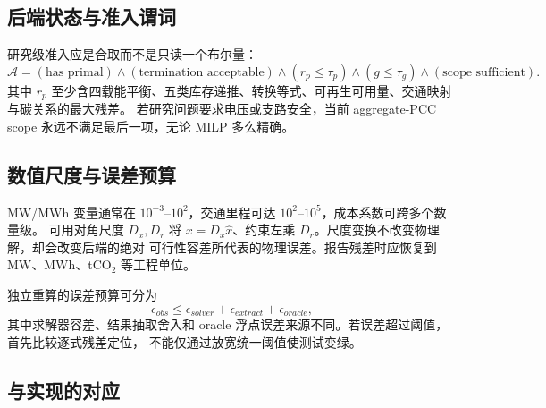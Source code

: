 \subsection{后端状态与准入谓词}

研究级准入应是合取而不是只读一个布尔量：
\begin{equation}
 \mathcal A=(\text{has primal})\land(\text{termination acceptable})\land
 (r_p\le\tau_p)\land(g\le\tau_g)\land(\text{scope sufficient}).
 \label{eq:ies-admission}
\end{equation}
其中 $r_p$ 至少含四载能平衡、五类库存递推、转换等式、可再生可用量、交通映射与碳关系的最大残差。
若研究问题要求电压或支路安全，当前 aggregate-PCC scope 永远不满足最后一项，无论 MILP 多么精确。

\subsection{数值尺度与误差预算}

MW/MWh 变量通常在 $10^{-3}$--$10^2$，交通里程可达 $10^2$--$10^5$，成本系数可跨多个数量级。
可用对角尺度 $D_x,D_r$ 将 $x=D_x\hat x$、约束左乘 $D_r$。尺度变换不改变物理解，却会改变后端的绝对
可行性容差所代表的物理误差。报告残差时应恢复到 MW、MWh、tCO$_2$ 等工程单位。

独立重算的误差预算可分为
\begin{equation}
 \epsilon_{obs}\le\epsilon_{solver}+\epsilon_{extract}+\epsilon_{oracle},
\end{equation}
其中求解器容差、结果抽取舍入和 oracle 浮点误差来源不同。若误差超过阈值，首先比较逐式残差定位，
不能仅通过放宽统一阈值使测试变绿。

\subsection{与实现的对应}

